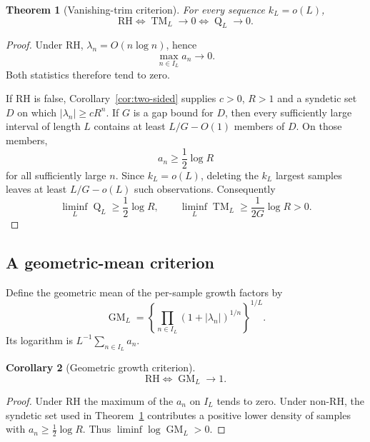 \documentclass[11pt]{amsart}
\numberwithin{equation}{section}
\newtheorem{theorem}{Theorem}[section]
\newtheorem{corollary}[theorem]{Corollary}
\theoremstyle{definition}
\theoremstyle{remark}
\newcommand{\RH}{\mathrm{RH}}
\begin{document}
\begin{theorem}[Vanishing-trim criterion]
\label{thm:trim}
For every sequence \(k_L=o(L)\),
\begin{equation}
 \boxed{
 \RH\Longleftrightarrow
 \operatorname{TM}_L\longrightarrow0
 \Longleftrightarrow
 \operatorname{Q}_L\longrightarrow0.}                   \label{eq:8.4}
\end{equation}
\end{theorem}

\begin{proof}
Under RH, \(\lambda_n=O(n\log n)\), hence
\[
 \max_{n\in I_L}a_n\longrightarrow0.
\]
Both statistics therefore tend to zero.

If RH is false, Corollary~\ref{cor:two-sided} supplies \(c>0\), \(R>1\)
and a syndetic set \(D\) on which \(|\lambda_n|\ge cR^n\). If \(G\) is a
gap bound for \(D\), then every sufficiently large interval of length
\(L\) contains at least \(L/G-O(1)\) members of \(D\). On those members,
\[
 a_n\ge\frac12\log R
\]
for all sufficiently large \(n\). Since \(k_L=o(L)\), deleting the
\(k_L\) largest samples leaves at least \(L/G-o(L)\) such observations.
Consequently
\[
 \liminf_L\operatorname{Q}_L\ge\frac12\log R,\qquad
 \liminf_L\operatorname{TM}_L\ge\frac1{2G}\log R>0.
\]
\end{proof}

\subsection{A geometric-mean criterion}

Define the geometric mean of the per-sample growth factors by
\begin{equation}
 \operatorname{GM}_L
 =\left\{\prod_{n\in I_L}(1+|\lambda_n|)^{1/n}\right\}^{1/L}.
                                                               \label{eq:8.5}
\end{equation}
Its logarithm is \(L^{-1}\sum_{n\in I_L}a_n\).

\begin{corollary}[Geometric growth criterion]
\label{cor:geom}
\begin{equation}
 \boxed{\RH\Longleftrightarrow\operatorname{GM}_L\to1.} \label{eq:8.6}
\end{equation}
\end{corollary}

\begin{proof}
Under RH the maximum of the \(a_n\) on \(I_L\) tends to zero. Under
non-RH, the syndetic set used in Theorem~\ref{thm:trim} contributes a
positive lower density of samples with \(a_n\ge\frac12\log R\). Thus
\(\liminf\log\operatorname{GM}_L>0\).
\end{proof}
\end{document}
